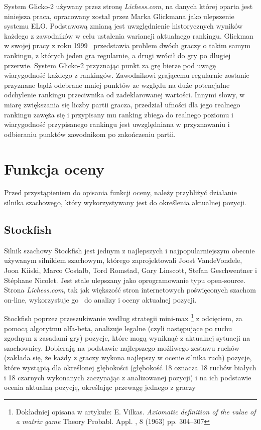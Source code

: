 \documentclass[inzynierska]{pwr_wmat_praca_dyplomowa}
\theoremstyle{plain}
\numberwithin{theorem}{chapter}
\theoremstyle{definition}
\numberwithin{theorem}{chapter}
\begin{document}
System Glicko-2  używany przez stronę \textit{Lichess.com}, na danych której oparta jest niniejsza praca, opracowany został przez Marka Glickmana jako ulepszenie systemu ELO. Podstawową zmianą jest uwzględnienie historycznych wyników każdego z zawodników w celu ustalenia wariancji aktualnego rankingu. Glickman w swojej pracy z roku 1999~\cite{glicko} przedstawia problem dwóch graczy o takim samym rankingu, z których jeden gra regularnie, a drugi wrócił do gry po długiej przerwie. System Glicko-2 przyznając punkt za grę bierze pod uwagę wiarygodność każdego z rankingów. Zawodnikowi grającemu regularnie zostanie przyznane bądź odebrane mniej punktów ze względu na duże potencjalne odchylenie rankingu przeciwnika od zadeklarowanej wartości. Innymi słowy, w miarę zwiększania się liczby partii gracza, przedział ufności dla jego realnego rankingu zawęża się i przypisany mu ranking zbiega do realnego poziomu i wiarygodność przypisanego rankingu jest uwzględniana w przyznawaniu i odbieraniu punktów zawodnikom po zakończeniu partii.

\section{Funkcja oceny}
Przed przystąpieniem do opisania funkcji oceny, należy przybliżyć działanie silnika szachowego, który wykorzystywany jest do określenia aktualnej pozycji.
\subsection{Stockfish}
Silnik szachowy Stockfish \cite{stockfish} jest jednym z najlepszych i najpopularniejszym obecnie używanym silnikiem szachowym, którego zaprojektowali Joost VandeVondele, Joon Kiiski, Marco Costalb, Tord Romstad, Gary Linscott, Stefan Geschwentner i Stéphane Nicolet. Jest stale ulepszany jako oprogramowanie typu open-source. Strona \textit{Lichess.com}, tak jak większość stron internetowych poświęconych szachom on-line, wykorzystuje go~\cite{stockfish_lichess} do analizy i oceny aktualnej pozycji.

Stockfish poprzez przeszukiwanie według strategii mini-max \footnote{Dokładniej opisana w artykule: E. Vilkas. \textit{Axiomatic definition of the value of a matrix game} Theory Probabl. Appl. , 8 (1963) pp. 304–307} z odcięciem, za pomocą algorytmu alfa-beta, analizuje legalne (czyli następujące po ruchu zgodnym z zasadami gry) pozycje, które mogą wyniknąć z aktualnej sytuacji na szachownicy. Dobierają na podstawie najlepszego możliwego zestawu ruchów (zakłada się, że każdy z graczy wykona najlepszy w ocenie silnika ruch) pozycje, które wystąpią dla określonej głębokości (głębokość 18 oznacza 18 ruchów białych i 18 czarnych wykonanych zaczynając z analizowanej pozycji) i na ich podstawie ocenia aktualną pozycję, określając przewagę jednego z graczy
\end{document}
